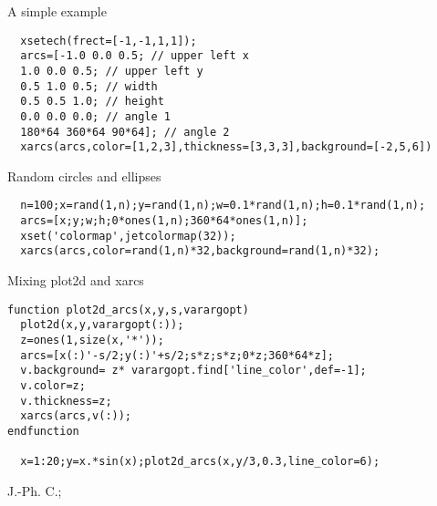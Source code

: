 \begin{examples}

\noindent A simple example

\begin{Verbatim}
  xsetech(frect=[-1,-1,1,1]);
  arcs=[-1.0 0.0 0.5; // upper left x
  1.0 0.0 0.5; // upper left y
  0.5 1.0 0.5; // width
  0.5 0.5 1.0; // height
  0.0 0.0 0.0; // angle 1
  180*64 360*64 90*64]; // angle 2
  xarcs(arcs,color=[1,2,3],thickness=[3,3,3],background=[-2,5,6])
\end{Verbatim}

\noindent Random circles and ellipses

\begin{Verbatim}
  n=100;x=rand(1,n);y=rand(1,n);w=0.1*rand(1,n);h=0.1*rand(1,n);
  arcs=[x;y;w;h;0*ones(1,n);360*64*ones(1,n)];
  xset('colormap',jetcolormap(32));
  xarcs(arcs,color=rand(1,n)*32,background=rand(1,n)*32);
\end{Verbatim}

\noindent Mixing plot2d and xarcs 

\begin{Verbatim}
function plot2d_arcs(x,y,s,varargopt)
  plot2d(x,y,varargopt(:));
  z=ones(1,size(x,'*'));
  arcs=[x(:)'-s/2;y(:)'+s/2;s*z;s*z;0*z;360*64*z];
  v.background= z* varargopt.find['line_color',def=-1];
  v.color=z;
  v.thickness=z;
  xarcs(arcs,v(:));
endfunction

  x=1:20;y=x.*sin(x);plot2d_arcs(x,y/3,0.3,line_color=6);
\end{Verbatim}

\end{examples}

\begin{manseealso}
    
\end{manseealso}


\begin{authors}
  J.-Ph. C.;
\end{authors}
